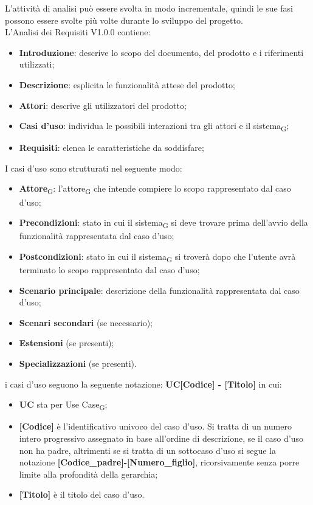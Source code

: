 L'attività di analisi può essere svolta in modo incrementale, quindi le sue fasi possono essere svolte più volte durante lo sviluppo del progetto. 
\\
L'Analisi dei Requisiti V1.0.0 contiene:
\begin{itemize}
    \item \textbf{Introduzione}: descrive lo scopo del documento, del prodotto e i riferimenti utilizzati;
    \item \textbf{Descrizione}: esplicita le funzionalità attese del prodotto;
    \item \textbf{Attori}: descrive gli utilizzatori del prodotto;
    \item \textbf{Casi d'uso}: individua le possibili interazioni tra gli attori e il sistema\textsubscript{G};
    \item \textbf{Requisiti}: elenca le caratteristiche da soddisfare;
\end{itemize}
I casi d’uso sono strutturati nel seguente modo:
\begin{itemize}
    \item \textbf{Attore}\textsubscript{G}: l’attore\textsubscript{G} che intende compiere lo scopo rappresentato dal caso d’uso;
    \item \textbf{Precondizioni}: stato in cui il sistema\textsubscript{G} si deve trovare prima dell’avvio della funzionalità rappresentata dal caso d’uso;
    \item \textbf{Postcondizioni}: stato in cui il sistema\textsubscript{G} si troverà dopo che l'utente avrà terminato lo scopo rappresentato dal caso d’uso;
    \item \textbf{Scenario principale}: descrizione della funzionalità rappresentata dal caso d’uso;
    \item \textbf{Scenari secondari} (se necessario);
    \item \textbf{Estensioni} (se presenti);
    \item \textbf{Specializzazioni} (se presenti).
\end{itemize}
i casi d'uso seguono la seguente notazione: \textbf{UC[Codice] - [Titolo]} in cui:
\begin{itemize}
    \item \textbf{UC} sta per Use Case\textsubscript{G};
    \item \textbf{[Codice]} è l'identificativo univoco del caso d'uso. Si tratta di un numero intero progressivo assegnato in base all'ordine di descrizione, se il caso d'uso non ha padre, altrimenti se si tratta di un sottocaso d'uso si segue la notazione\textbf{ [Codice\_padre]-[Numero\_figlio]}, ricorsivamente senza porre limite alla profondità della gerarchia;
    \item \textbf{[Titolo]} è il titolo del caso d'uso.
\end{itemize}

